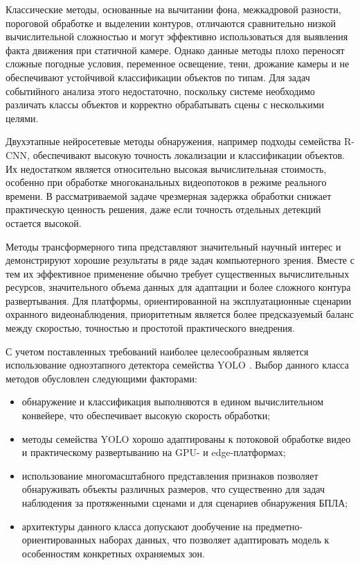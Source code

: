 Классические методы, основанные на вычитании фона, межкадровой разности, пороговой обработке и выделении контуров, отличаются сравнительно низкой вычислительной сложностью и могут эффективно использоваться для выявления факта движения при статичной камере. Однако данные методы плохо переносят сложные погодные условия, переменное освещение, тени, дрожание камеры и не обеспечивают устойчивой классификации объектов по типам. Для задач событийного анализа этого недостаточно, поскольку системе необходимо различать классы объектов и корректно обрабатывать сцены с несколькими целями.

Двухэтапные нейросетевые методы обнаружения, например подходы семейства R-CNN, обеспечивают высокую точность локализации и классификации объектов. Их недостатком является относительно высокая вычислительная стоимость, особенно при обработке многоканальных видеопотоков в режиме реального времени. В рассматриваемой задаче чрезмерная задержка обработки снижает практическую ценность решения, даже если точность отдельных детекций остается высокой.

Методы трансформерного типа представляют значительный научный интерес и демонстрируют хорошие результаты в ряде задач компьютерного зрения. Вместе с тем их эффективное применение обычно требует существенных вычислительных ресурсов, значительного объема данных для адаптации и более сложного контура развертывания. Для платформы, ориентированной на эксплуатационные сценарии охранного видеонаблюдения, приоритетным является более предсказуемый баланс между скоростью, точностью и простотой практического внедрения.

С учетом поставленных требований наиболее целесообразным является использование одноэтапного детектора семейства YOLO \cite{redmon2016yolo,redmon2018yolov3,ultralytics_docs}. Выбор данного класса методов обусловлен следующими факторами:
\begin{itemize}
    \item обнаружение и классификация выполняются в едином вычислительном конвейере, что обеспечивает высокую скорость обработки;
    \item методы семейства YOLO хорошо адаптированы к потоковой обработке видео и практическому развертыванию на GPU- и edge-платформах;
    \item использование многомасштабного представления признаков позволяет обнаруживать объекты различных размеров, что существенно для задач наблюдения за протяженными сценами и для сценариев обнаружения БПЛА;
    \item архитектуры данного класса допускают дообучение на предметно-ориентированных наборах данных, что позволяет адаптировать модель к особенностям конкретных охраняемых зон.
\end{itemize}

